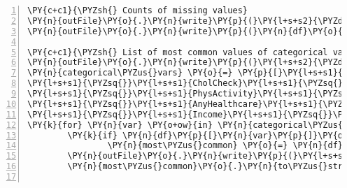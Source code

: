 \documentclass[12pt]{article}
\begin{document}
\begin{Verbatim}[commandchars=\\\{\},numbers=left,firstnumber=1,stepnumber=1,formatcom=\footnotesize]
\PY{c+c1}{\PYZsh{} Counts of missing values}
\PY{n}{outFile}\PY{o}{.}\PY{n}{write}\PY{p}{(}\PY{l+s+s2}{\PYZdq{}}\PY{l+s+s2}{Count of missing values:}\PY{l+s+se}{\PYZbs{}n}\PY{l+s+s2}{\PYZdq{}}\PY{p}{)}
\PY{n}{outFile}\PY{o}{.}\PY{n}{write}\PY{p}{(}\PY{n}{df}\PY{o}{.}\PY{n}{isna}\PY{p}{(}\PY{p}{)}\PY{o}{.}\PY{n}{sum}\PY{p}{(}\PY{p}{)}\PY{o}{.}\PY{n}{to\PYZus{}string}\PY{p}{(}\PY{p}{)} \PY{o}{+} \PY{l+s+s2}{\PYZdq{}}\PY{l+s+se}{\PYZbs{}n}\PY{l+s+se}{\PYZbs{}n}\PY{l+s+s2}{\PYZdq{}}\PY{p}{)}

\PY{c+c1}{\PYZsh{} List of most common values of categorical variables}
\PY{n}{outFile}\PY{o}{.}\PY{n}{write}\PY{p}{(}\PY{l+s+s2}{\PYZdq{}}\PY{l+s+s2}{Most common values of categorical variables:}\PY{l+s+se}{\PYZbs{}n}\PY{l+s+se}{\PYZbs{}n}\PY{l+s+s2}{\PYZdq{}}\PY{p}{)}
\PY{n}{categorical\PYZus{}vars} \PY{o}{=} \PY{p}{[}\PY{l+s+s1}{\PYZsq{}}\PY{l+s+s1}{Diabetes\PYZus{}binary}\PY{l+s+s1}{\PYZsq{}}\PY{p}{,} \PY{l+s+s1}{\PYZsq{}}\PY{l+s+s1}{HighBP}\PY{l+s+s1}{\PYZsq{}}\PY{p}{,} \PY{l+s+s1}{\PYZsq{}}\PY{l+s+s1}{HighChol}\PY{l+s+s1}{\PYZsq{}}\PY{p}{,} \PYZbs{}
\PY{l+s+s1}{\PYZsq{}}\PY{l+s+s1}{CholCheck}\PY{l+s+s1}{\PYZsq{}}\PY{p}{,} \PY{l+s+s1}{\PYZsq{}}\PY{l+s+s1}{Smoker}\PY{l+s+s1}{\PYZsq{}}\PY{p}{,} \PY{l+s+s1}{\PYZsq{}}\PY{l+s+s1}{Stroke}\PY{l+s+s1}{\PYZsq{}}\PY{p}{,} \PY{l+s+s1}{\PYZsq{}}\PY{l+s+s1}{HeartDiseaseorAttack}\PY{l+s+s1}{\PYZsq{}}\PY{p}{,} \PYZbs{}
\PY{l+s+s1}{\PYZsq{}}\PY{l+s+s1}{PhysActivity}\PY{l+s+s1}{\PYZsq{}}\PY{p}{,} \PY{l+s+s1}{\PYZsq{}}\PY{l+s+s1}{Fruits}\PY{l+s+s1}{\PYZsq{}}\PY{p}{,} \PY{l+s+s1}{\PYZsq{}}\PY{l+s+s1}{Veggies}\PY{l+s+s1}{\PYZsq{}}\PY{p}{,} \PY{l+s+s1}{\PYZsq{}}\PY{l+s+s1}{HvyAlcoholConsump}\PY{l+s+s1}{\PYZsq{}}\PY{p}{,} \PYZbs{}
\PY{l+s+s1}{\PYZsq{}}\PY{l+s+s1}{AnyHealthcare}\PY{l+s+s1}{\PYZsq{}}\PY{p}{,} \PY{l+s+s1}{\PYZsq{}}\PY{l+s+s1}{NoDocbcCost}\PY{l+s+s1}{\PYZsq{}}\PY{p}{,} \PY{l+s+s1}{\PYZsq{}}\PY{l+s+s1}{DiffWalk}\PY{l+s+s1}{\PYZsq{}}\PY{p}{,} \PY{l+s+s1}{\PYZsq{}}\PY{l+s+s1}{Sex}\PY{l+s+s1}{\PYZsq{}}\PY{p}{,} \PY{l+s+s1}{\PYZsq{}}\PY{l+s+s1}{Age}\PY{l+s+s1}{\PYZsq{}}\PY{p}{,} \PY{l+s+s1}{\PYZsq{}}\PY{l+s+s1}{Education}\PY{l+s+s1}{\PYZsq{}}\PY{p}{,} \PYZbs{}
\PY{l+s+s1}{\PYZsq{}}\PY{l+s+s1}{Income}\PY{l+s+s1}{\PYZsq{}}\PY{p}{]}
\PY{k}{for} \PY{n}{var} \PY{o+ow}{in} \PY{n}{categorical\PYZus{}vars}\PY{p}{:}
        \PY{k}{if} \PY{n}{df}\PY{p}{[}\PY{n}{var}\PY{p}{]}\PY{o}{.}\PY{n}{dtype} \PY{o}{==} \PY{l+s+s1}{\PYZsq{}}\PY{l+s+s1}{int}\PY{l+s+s1}{\PYZsq{}} \PY{o+ow}{and} \PY{n+nb}{len}\PY{p}{(}\PY{n}{df}\PY{p}{[}\PY{n}{var}\PY{p}{]}\PY{o}{.}\PY{n}{unique}\PY{p}{(}\PY{p}{)}\PY{p}{)} \PY{o}{\PYZlt{}}\PY{o}{=} \PY{l+m+mi}{10}\PY{p}{:}
                \PY{n}{most\PYZus{}common} \PY{o}{=} \PY{n}{df}\PY{p}{[}\PY{n}{var}\PY{p}{]}\PY{o}{.}\PY{n}{value\PYZus{}counts}\PY{p}{(}\PY{p}{)}\PY{o}{.}\PY{n}{nlargest}\PY{p}{(}\PY{l+m+mi}{2}\PY{p}{)}
        \PY{n}{outFile}\PY{o}{.}\PY{n}{write}\PY{p}{(}\PY{l+s+s2}{\PYZdq{}}\PY{l+s+si}{\PYZob{}:\PYZlt{}20\PYZcb{}}\PY{l+s+s2}{ }\PY{l+s+si}{\PYZob{}\PYZcb{}}\PY{l+s+se}{\PYZbs{}n}\PY{l+s+s2}{\PYZdq{}}\PY{o}{.}\PY{n}{format}\PY{p}{(}\PY{n}{var}\PY{p}{,} \PYZbs{}
        \PY{n}{most\PYZus{}common}\PY{o}{.}\PY{n}{to\PYZus{}string}\PY{p}{(}\PY{p}{)}\PY{p}{)}\PY{p}{)}


\end{Verbatim}
\end{document}
